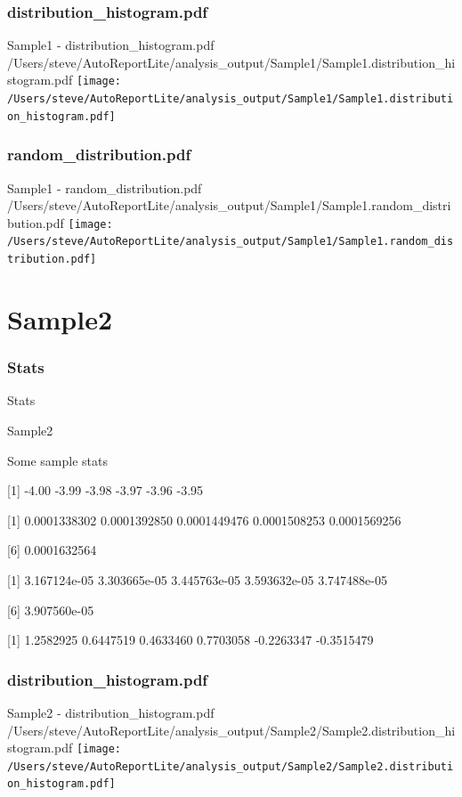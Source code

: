 \documentclass[8pt]{beamer}\usepackage[]{graphicx}\usepackage[]{color}
\begin{document}
\subsubsection{distribution\_histogram.pdf}
\begin{frame}{Sample1 - distribution\_histogram.pdf }
\scriptsize{/Users/steve/AutoReportLite/analysis\_output/Sample1/Sample1.distribution\_histogram.pdf}
\texttt{[image: /Users/steve/AutoReportLite/analysis\_output/Sample1/Sample1.distribution\_histogram.pdf]}
\end{frame}

\subsubsection{random\_distribution.pdf}
\begin{frame}{Sample1 - random\_distribution.pdf }
\scriptsize{/Users/steve/AutoReportLite/analysis\_output/Sample1/Sample1.random\_distribution.pdf}
\texttt{[image: /Users/steve/AutoReportLite/analysis\_output/Sample1/Sample1.random\_distribution.pdf]}
\end{frame}

\section{Sample2}
\subsubsection{Stats}
\begin{frame}{Stats }
\small{
Sample2 

Some sample stats

[1] -4.00 -3.99 -3.98 -3.97 -3.96 -3.95

[1] 0.0001338302 0.0001392850 0.0001449476 0.0001508253 0.0001569256

[6] 0.0001632564

[1] 3.167124e-05 3.303665e-05 3.445763e-05 3.593632e-05 3.747488e-05

[6] 3.907560e-05

[1]  1.2582925  0.6447519  0.4633460  0.7703058 -0.2263347 -0.3515479
}

\end{frame}

\subsubsection{distribution\_histogram.pdf}
\begin{frame}{Sample2 - distribution\_histogram.pdf }
\scriptsize{/Users/steve/AutoReportLite/analysis\_output/Sample2/Sample2.distribution\_histogram.pdf}
\texttt{[image: /Users/steve/AutoReportLite/analysis\_output/Sample2/Sample2.distribution\_histogram.pdf]}
\end{frame}
\end{document}
